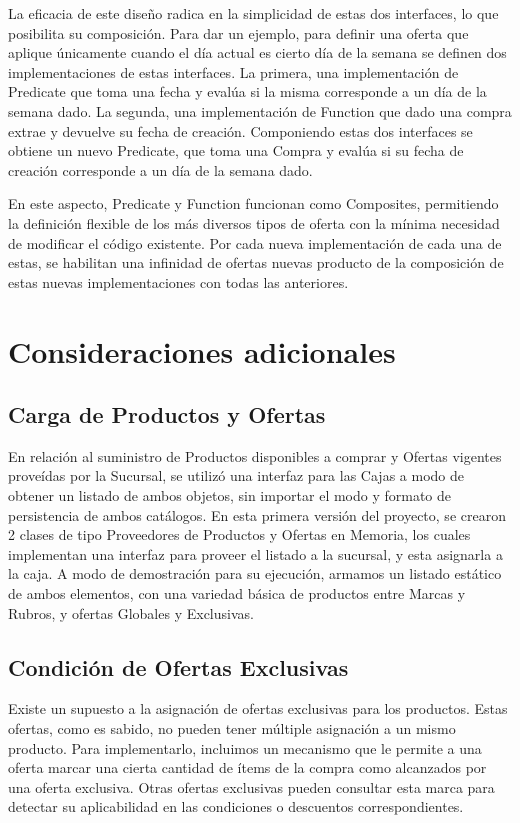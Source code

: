 \documentclass[a4paper,11pt]{article}
\begin{document}
La eficacia de este diseño radica en la simplicidad de estas dos interfaces, lo
que posibilita su composición. Para dar un ejemplo, para definir una oferta que
aplique únicamente cuando el día actual es cierto día de la semana se definen
dos implementaciones de estas interfaces. La primera, una implementación de
Predicate que toma una fecha y evalúa si la misma corresponde a un día de la
semana dado. La segunda, una implementación de Function que dado una compra
extrae y devuelve su fecha de creación. Componiendo estas dos interfaces se
obtiene un nuevo Predicate, que toma una Compra y evalúa si su fecha de
creación corresponde a un día de la semana dado.

En este aspecto, Predicate y Function funcionan como Composites, permitiendo la
definición flexible de los más diversos tipos de oferta con la mínima necesidad
de modificar el código existente. Por cada nueva implementación de cada una de
estas, se habilitan una infinidad de ofertas nuevas producto de la composición
de estas nuevas implementaciones con todas las anteriores.

\section{Consideraciones adicionales}

\subsection{Carga de Productos y Ofertas}

En relación al suministro de Productos disponibles a comprar y Ofertas vigentes
proveídas por la Sucursal, se utilizó una interfaz para las Cajas a modo de
obtener un listado de ambos objetos, sin importar el modo y formato de
persistencia de ambos catálogos.  En esta primera versión del proyecto, se
crearon 2 clases de tipo Proveedores de Productos y Ofertas en Memoria, los
cuales implementan una interfaz para proveer el listado a la sucursal, y esta
asignarla a la caja.  A modo de demostración para su ejecución, armamos un
listado estático de ambos elementos, con una variedad básica de productos entre
Marcas y Rubros, y ofertas Globales y Exclusivas.

\subsection{Condición de Ofertas Exclusivas}

Existe un supuesto a la asignación de ofertas exclusivas para los productos.
Estas ofertas, como es sabido, no pueden tener múltiple asignación a un mismo
producto. Para implementarlo, incluimos un mecanismo que le permite a una
oferta marcar una cierta cantidad de ítems de la compra como alcanzados por una
oferta exclusiva. Otras ofertas exclusivas pueden consultar esta marca para
detectar su aplicabilidad en las condiciones o descuentos correspondientes.
\end{document}
